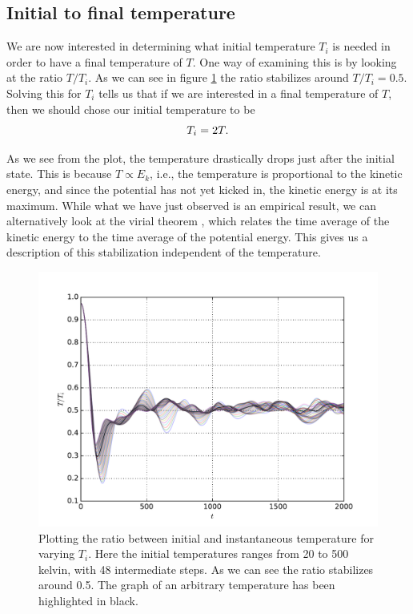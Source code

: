 \documentclass[a4paper]{article}
\begin{document}
\subsection{Initial to final temperature}
\label{sub:initial_to_final_temperature}

    We are now interested in determining what initial temperature $T_i$ is needed
    in order to have a final temperature of $T$.  One way of examining this is by
    looking at the ratio $T/T_i$. As we can see in figure \ref{fig:temperature_ratio} the
    ratio stabilizes around $T/T_i = 0.5$. Solving this for $T_i$ tells us that if
    we are interested in a final temperature of $T$, then we should chose our
    initial temperature to be
    \begin{equation}
        \notag
        T_i = 2T.
    \end{equation}

    As we see from the plot, the temperature drastically drops just after the
    initial state. This is because $T \propto E_k$, i.e., the temperature is
    proportional to the kinetic energy, and since the potential has not yet kicked
    in, the kinetic energy is at its maximum. While what we have just observed is
    an empirical result, we can alternatively look at the virial theorem
    \cite{virial}, which relates the time average of the kinetic energy to the time
    average of the potential energy. This gives us a description of this
    stabilization independent of the temperature. 

    \begin{figure}[h]
        \centering \includegraphics[width=\linewidth]{temperature_ratio.pdf}
        \caption[Temperature ratio]{Plotting the ratio between initial and
            instantaneous temperature for varying $T_i$. Here the initial
            temperatures ranges from 20 to 500 kelvin, with 48 intermediate steps.
        As we can see the ratio stabilizes around 0.5. The graph of an arbitrary
    temperature has been highlighted in black.}
        \label{fig:temperature_ratio}
    \end{figure}
\end{document}
